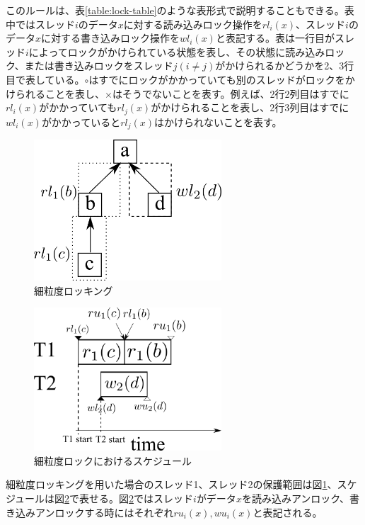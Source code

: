 \documentclass[a4paper]{jreport}	%
\begin{document}
このルールは、表\ref{table:lock-table}のような表形式で説明することもできる。表中ではスレッド$i$のデータ$x$に対する読み込みロック操作を$rl_i(x)$、スレッド$i$のデータ$x$に対する書き込みロック操作を$wl_i(x)$と表記する。表は一行目がスレッド$i$によってロックがかけられている状態を表し、その状態に読み込みロック、または書き込みロックをスレッド$j(i \neq j)$がかけられるかどうかを2、3行目で表している。$\circ$はすでにロックがかかっていても別のスレッドがロックをかけられることを表し、$\times$はそうでないことを表す。例えば、2行2列目はすでに$rl_i(x)$がかかっていても$rl_j(x)$がかけられることを表し、2行3列目はすでに$wl_i(x)$がかかっていると$rl_j(x)$はかけられないことを表す。

\begin{figure}[h] 
\centering
\includegraphics[width=7cm]{high-gran-lock}
\caption{細粒度ロッキング}
\label{fig:high-gran-lock}
\end{figure}


\begin{figure}[h] 
\centering
\includegraphics[width=7cm]{high-gran-time}
\caption{細粒度ロックにおけるスケジュール}
\label{fig:high-gran-time}
\end{figure}



細粒度ロッキングを用いた場合のスレッド1、スレッド2の保護範囲は図\ref{fig:high-gran-lock}、スケジュールは図\ref{fig:high-gran-time}で表せる。図\ref{fig:high-gran-time}ではスレッド$i$がデータ$x$を読み込みアンロック、書き込みアンロックする時にはそれぞれ$ru_i(x), wu_i(x)$と表記される。
\end{document}
